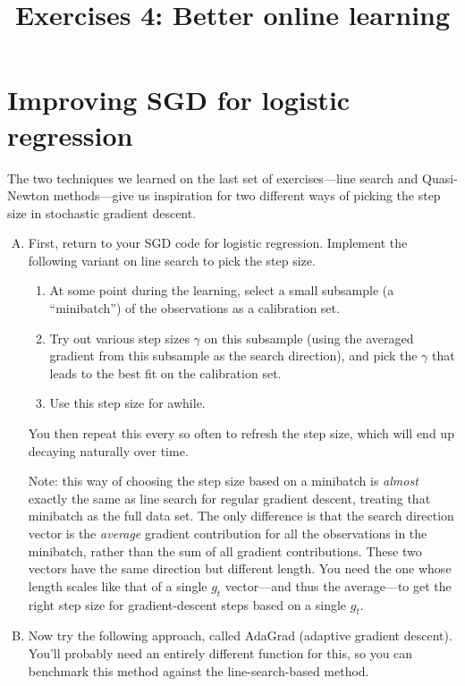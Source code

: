 \documentclass{mynotes}
\title[Exercises 4 $\cdot$ SDS 385]{Exercises 4: Better online learning}
\date{}  %
\begin{document}
\maketitle%

\bigskip


\section{Improving SGD for logistic regression}

The two techniques we learned on the last set of exercises---line search and Quasi-Newton methods---give us inspiration for two different ways of picking the step size in stochastic gradient descent.

\begin{enumerate}[(A)]

\item First, return to your SGD code for logistic regression.  Implement the following variant on line search to pick the step size.
\begin{enumerate}[1.]
\item At some point during the learning, select a small subsample (a ``minibatch'') of the observations as a calibration set.
\item Try out various step sizes $\gamma$ on this subsample (using the averaged gradient from this subsample as the search direction), and pick the $\gamma$ that leads to the best fit on the calibration set.
\item Use this step size for awhile.
\end{enumerate}
You then repeat this every so often to refresh the step size, which will end up decaying naturally over time.

Note: this way of choosing the step size based on a minibatch is \textit{almost} exactly the same as line search for regular gradient descent, treating that minibatch as the full data set.  The only difference is that the search direction vector is the \textit{average} gradient contribution for all the observations in the minibatch, rather than the sum of all gradient contributions.  These two vectors have the same direction but different length.  You need the one whose length scales like that of a single $g_t$ vector---and thus the average---to get the right step size for gradient-descent steps based on a single $g_t$.


\item Now try the following approach, called AdaGrad (adaptive gradient descent).  You'll probably need an entirely different function for this, so you can benchmark this method against the line-search-based method.


\end{enumerate}
\end{document}

